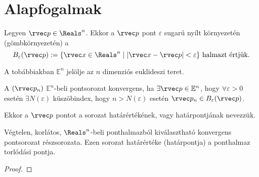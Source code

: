 \clearpage
\section{Alapfogalmak}\label{sec-03-01}

\begin{definition}[Gömbkörnyezet]
  Legyen $\rvec p \in \Reals^n$. Ekkor a $\rvec p$ pont $\varepsilon$ sugarú
  nyílt környezetén (gömbkörnyezetén) a
  $$
    B_\varepsilon(\rvec p) := \{
    \rvec x \in \Reals^n \mid | \rvec x - \rvec p | < \varepsilon
    \}
    \text{ halmazt értjük.}
  $$
\end{definition}

\begin{note}
  A tobábbiakban $\mathbb E^n$ jelölje az $n$ dimenziós euklideszi teret.
\end{note}

\begin{definition}
  A $(\rvec p_n)$ $\mathbb E^n$-beli pontsorozat konvergens, ha
  $\exists \rvec p \in \mathbb E^n$, hogy $\forall \varepsilon > 0$ esetén
  $\exists N(\varepsilon)$ küszöbindex, hogy $n > N(\varepsilon)$ esetén
  $\rvec p_n \in B_\varepsilon(\rvec p)$.

  Ekkor a $\rvec p$ pontot a sorozat határértékének, vagy határpontjának
  nevezzük.
\end{definition}

\begin{theorem}
  Végtelen, korlátos, $\Reals^n$-beli ponthalmazból kiválasztható konvergens
  pontsorozat részsorozata. Ezen sorozat határértéke (határpontja) a ponthalmaz
  torlódási pontja.

  \begin{proof}
    \vspace{8em}
  \end{proof}
\end{theorem}

